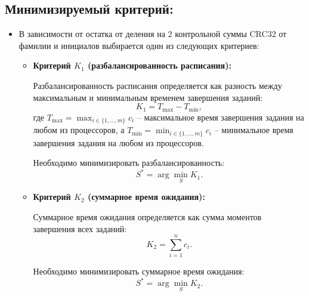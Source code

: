 \documentclass{article}
\begin{document}
        \subsection*{Минимизируемый критерий:}
            \begin{itemize}
                \item В зависимости от остатка от деления на 2 контрольной суммы CRC32 от фамилии и инициалов выбирается один из следующих критериев:
                
                \begin{itemize}
                    \item \textbf{Критерий $K_1$ (разбалансированность расписания):}
                    
                    Разбалансированность расписания определяется как разность между максимальным и минимальным временем завершения заданий:
                    \begin{equation}
                        K_1 = T_{\text{max}} - T_{\text{min}},
                    \end{equation}
                    где $T_{\text{max}} = \max_{i \in \{1, \dots, m\}} c_i$ -- максимальное время завершения задания на любом из процессоров, а $T_{\text{min}} = \min_{i \in \{1, \dots, m\}} c_i$ -- минимальное время завершения задания на любом из процессоров.
                    
                    Необходимо минимизировать разбалансированность:
                    \begin{equation}
                        S^* = \arg \min_{S} K_1.
                    \end{equation}
                    
                    \item \textbf{Критерий $K_2$ (суммарное время ожидания):}
                    
                    Суммарное время ожидания определяется как сумма моментов завершения всех заданий:
                    \begin{equation}
                        K_2 = \sum_{i=1}^{n} c_i.
                    \end{equation}
                    
                    Необходимо минимизировать суммарное время ожидания:
                    \begin{equation}
                        S^* = \arg \min_{S} K_2.
                    \end{equation}
                \end{itemize}
            \end{itemize}
\end{document}
